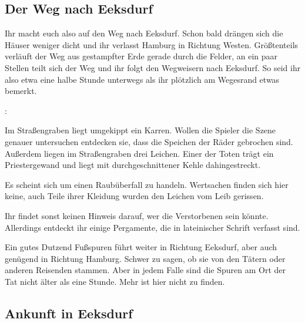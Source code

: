 
\subsection{Der Weg nach Eeksdurf}
\label{nachxd}

Ihr macht euch also auf den Weg nach Eeksdurf. Schon bald drängen sich die Häuser weniger dicht und ihr verlasst Hamburg in Richtung Westen. Größtenteils verläuft der Weg aus gestampfter Erde gerade durch die Felder, an ein paar Stellen teilt sich der Weg und ihr folgt den Wegweisern nach Eeksdurf. So seid ihr also etwa eine halbe Stunde unterwegs als ihr plötzlich am Wegesrand etwas bemerkt.

:

Im Straßengraben liegt umgekippt ein Karren. Wollen die Spieler die Szene genauer untersuchen entdecken sie, dass die Speichen der Räder gebrochen sind. Außerdem liegen im Straßengraben drei Leichen. Einer der Toten trägt ein Priestergewand und liegt mit durchgeschnittener Kehle dahingestreckt.


Es scheint sich um einen Raubüberfall zu handeln. Wertsachen finden sich hier keine, auch Teile ihrer Kleidung wurden den Leichen vom Leib gerissen.



Ihr findet sonst keinen Hinweis darauf, wer die Verstorbenen sein könnte. Allerdings entdeckt ihr einige Pergamente, die in lateinischer Schrift verfasst sind.


Ein gutes Dutzend Fußspuren führt weiter in Richtung Eeksdurf, aber auch genügend in Richtung Hamburg. Schwer zu sagen, ob sie von den Tätern oder anderen Reisenden stammen. Aber in jedem Falle sind die Spuren am Ort der Tat nicht älter als eine Stunde. Mehr ist hier nicht zu finden.

\subsection{Ankunft in Eeksdurf}
\label{inxd}

